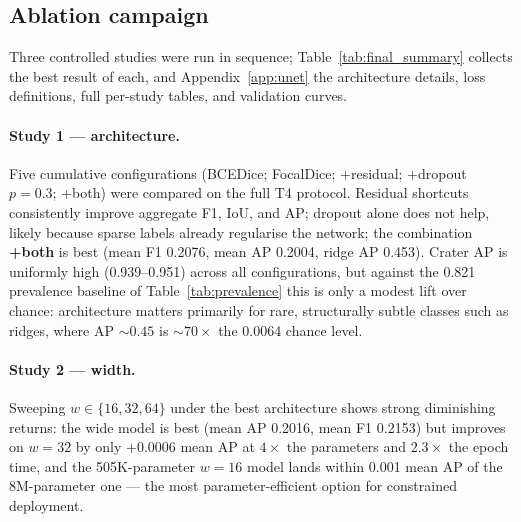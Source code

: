 \documentclass{aa}
\begin{document}
\subsection{Ablation campaign}
\label{sec:mr_augmentation}

Three controlled studies were run in sequence; Table~\ref{tab:final_summary} collects the best result of each, and Appendix~\ref{app:unet} the architecture details, loss definitions, full per-study tables, and validation curves.

\paragraph{Study 1 --- architecture.}
Five cumulative configurations (BCEDice; FocalDice; +residual; +dropout $p=0.3$; +both) were compared on the full T4 protocol. Residual shortcuts consistently improve aggregate F1, IoU, and AP; dropout alone does not help, likely because sparse labels already regularise the network; the combination \textbf{+both} is best (mean F1 0.2076, mean AP 0.2004, ridge AP 0.453). Crater AP is uniformly high (0.939--0.951) across all configurations, but against the 0.821 prevalence baseline of Table~\ref{tab:prevalence} this is only a modest lift over chance: architecture matters primarily for rare, structurally subtle classes such as ridges, where AP ${\sim}0.45$ is ${\sim}70\times$ the 0.0064 chance level.

\paragraph{Study 2 --- width.}
Sweeping $w\in\{16,32,64\}$ under the best architecture shows strong diminishing returns: the wide model is best (mean AP 0.2016, mean F1 0.2153) but improves on $w=32$ by only $+0.0006$ mean AP at $4\times$ the parameters and $2.3\times$ the epoch time, and the 505K-parameter $w=16$ model lands within 0.001 mean AP of the 8M-parameter one --- the most parameter-efficient option for constrained deployment.
\end{document}
